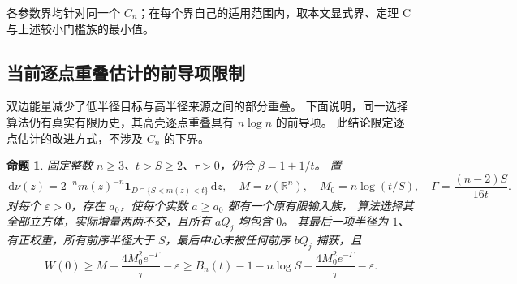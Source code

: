 \documentclass[UTF8,a4paper,11pt,fontset=fandol]{ctexart}
\newtheorem{proposition}[lemma]{命题}
\theoremstyle{remark}
\newcommand{\R}{\mathbb R}
\newcommand{\one}{\mathbf 1}
\newcommand{\dint}{\,\mathrm d}
\begin{document}
各参数界均针对同一个 $C_n$；在每个界自己的适用范围内，取本文显式界、定理 C 与上述较小门槛族的最小值。

\subsection{当前逐点重叠估计的前导项限制}
双边能量减少了低半径目标与高半径来源之间的部分重叠。
下面说明，同一选择算法仍有真实有限历史，其高壳逐点重叠具有 $n\log n$ 的前导项。
此结论限定逐点估计的改进方式，不涉及 $C_n$ 的下界。
\begin{proposition}\label{prop:barrier}
固定整数 $n\ge3$、$t>S\ge2$、$\tau>0$，仍令 $\beta=1+1/t$。
置
\[
 \dint\nu(z)=2^{-n}m(z)^{-n}\one_{D\cap\{S<m(z)<t\}}\dint z,
 \quad M=\nu(\R^n),\quad M_0=n\log(t/S),
 \quad\Gamma=\frac{(n-2)S}{16t}.
\]
对每个 $\varepsilon>0$，存在 $a_0$，使每个实数 $a\ge a_0$ 都有一个原有限输入族，
算法选择其全部立方体，实际增量两两不交，且所有 $aQ_j$ 均包含 $0$。
其最后一项半径为 $1$、有正权重，所有前序半径大于 $S$，最后中心未被任何前序 $bQ_j$ 捕获，且
\begin{equation}\label{eq:barrier}
 W(0)\ge M-\frac{4M_0^2e^{-\Gamma}}\tau-\varepsilon
 \ge B_n(t)-1-n\log S-\frac{4M_0^2e^{-\Gamma}}\tau-\varepsilon.
\end{equation}
\end{proposition}
\end{document}
